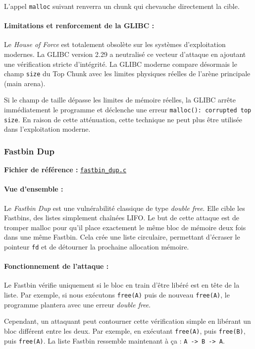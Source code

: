 L'appel \texttt{malloc} suivant renverra un chunk qui chevauche directement la cible.

\paragraph{Limitations et renforcement de la GLIBC :}
Le \textit{House of Force} est totalement obsolète sur les systèmes d'exploitation modernes. La GLIBC version 2.29 a neutralisé ce vecteur d'attaque en ajoutant une vérification stricte d'intégrité. La GLIBC moderne compare désormais le champ \texttt{size} du Top Chunk avec les limites physiques réelles de l'arène principale (main arena).

Si le champ de taille dépasse les limites de mémoire réelles, la GLIBC arrête immédiatement le programme et déclenche une erreur \texttt{malloc(): corrupted top size}. En raison de cette atténuation, cette technique ne peut plus être utilisée dans l'exploitation moderne.

\subsubsection{Fastbin Dup}

\noindent\textbf{Fichier de référence :} \href{https://github.com/shellphish/how2heap/blob/master/glibc_2.41/fastbin_dup.c}{\texttt{fastbin\_dup.c}}

\paragraph{Vue d'ensemble :}
Le \textit{Fastbin Dup} est une vulnérabilité classique de type \textit{double free}. Elle cible les Fastbins, des listes simplement chaînées LIFO. Le but de cette attaque est de tromper malloc pour qu'il place exactement le même bloc de mémoire deux fois dans une même Fastbin. Cela crée une liste circulaire, permettant d'écraser le pointeur \texttt{fd} et de détourner la prochaine allocation mémoire.

\paragraph{Fonctionnement de l'attaque :}
Le Fastbin vérifie uniquement si le bloc en train d'être libéré est en tête de la liste. Par exemple, si nous exécutons \texttt{free(A)} puis de nouveau \texttt{free(A)}, le programme plantera avec une erreur \textit{double free}.

Cependant, un attaquant peut contourner cette vérification simple en libérant un bloc différent entre les deux. Par exemple, en exécutant \texttt{free(A)}, puis \texttt{free(B)}, puis \texttt{free(A)}. La liste Fastbin ressemble maintenant à ça : \texttt{A -> B -> A}.

